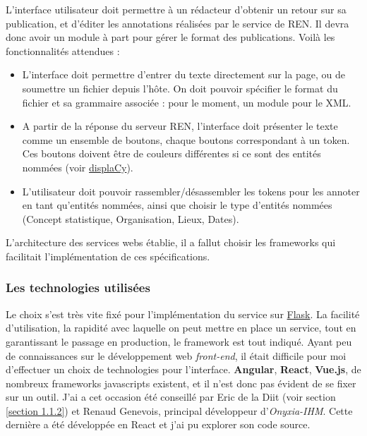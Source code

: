 L'interface utilisateur doit permettre à un rédacteur d'obtenir un retour sur sa publication, et d'éditer les annotations réalisées par le service de REN. Il devra donc avoir un module à part pour gérer le format des publications. Voilà les fonctionnalités attendues :
\begin{itemize}
    \item L'interface doit permettre d'entrer du texte directement sur la page, ou de soumettre un fichier depuis l'hôte. On doit pouvoir spécifier le format du fichier et sa grammaire associée : pour le moment, un module pour le XML.
    \item A partir de la réponse du serveur REN, l'interface doit présenter le texte comme un ensemble de boutons, chaque boutons correspondant à un token. Ces boutons doivent être de couleurs différentes si ce sont des entités nommées (voir \href{https://spacy.io/usage/visualizers#ent}{displaCy}).
    \item L'utilisateur doit pouvoir rassembler/désassembler les tokens pour les annoter en tant qu'entités nommées, ainsi que choisir le type d'entités nommées (Concept statistique, Organisation, Lieux, Dates).
    \newline
\end{itemize}

L'architecture des services webs établie, il a fallut choisir les frameworks qui facilitait l'implémentation de ces spécifications.

\label{section 3.2.1 - Architecture des services}

\subsubsection{Les technologies utilisées}
Le choix s'est très vite fixé pour l'implémentation du service sur \href{https://github.com/pallets/flask}{Flask}. La facilité d'utilisation, la rapidité avec laquelle on peut mettre en place un service, tout en garantissant le passage en production, le framework est tout indiqué. Ayant peu de connaissances sur le développement web \textit{front-end}, il était difficile pour moi d'effectuer un choix de technologies pour l'interface. \textbf{Angular}, \textbf{React}, \textbf{Vue.js}, de nombreux frameworks javascripts existent, et il n'est donc pas évident de se fixer sur un outil. J'ai a cet occasion été conseillé par Eric de la Diit (voir section \ref{section 1.1.2}) et Renaud Genevois, principal développeur d'\textit{Onyxia-IHM}. Cette dernière a été développée en React et j'ai pu explorer son code source.
\label{section 3.2.2}

